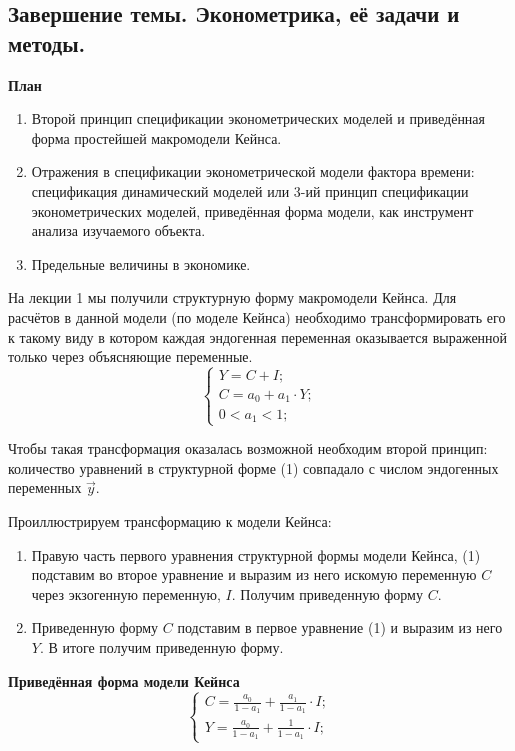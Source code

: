 \documentclass[12pt,a4paper]{article}
\author{GH-TIMe}
\begin{document}
\begin{center}
\section*{Завершение темы. Эконометрика, её задачи и методы.}
\end{center}
\begin{center}
\textbf{План}
\end{center}
\begin{enumerate}
\item Второй принцип спецификации эконометрических моделей и приведённая форма простейшей макромодели Кейнса.
\item Отражения в спецификации эконометрической модели фактора времени: спецификация динамический моделей или 3-ий принцип спецификации эконометрических моделей, приведённая форма модели, как инструмент анализа изучаемого объекта.
\item Предельные величины в экономике.
\end{enumerate}
На лекции 1 мы получили структурную форму макромодели Кейнса. Для расчётов в данной модели (по моделе Кейнса) необходимо трансформировать его к такому виду в котором каждая эндогенная переменная оказывается выраженной только через объясняющие переменные.
\begin{equation}
\begin{cases}
Y = C + I; \\
C = a_0 + a_1 \cdot Y; \\
0 < a_1 < 1;
\end{cases}
\end{equation}

Чтобы такая трансформация оказалась возможной необходим второй принцип: количество уравнений в структурной форме (1) совпадало с числом эндогенных переменных $\vec{y}$. 

Проиллюстрируем трансформацию к модели Кейнса:
\begin{enumerate}
\item Правую часть первого уравнения структурной формы модели Кейнса, (1) подставим во второе уравнение и выразим из него искомую переменную $C$ через экзогенную переменную, $I$. Получим приведенную форму $C$.
\item Приведенную форму $C$ подставим в первое уравнение (1) и выразим из него $Y$. В итоге получим приведенную форму.
\end{enumerate}
\textbf{Приведённая форма модели Кейнса}
\begin{equation}
\begin{cases}
C = \displaystyle{\frac{a_0}{1-a_1} + \frac{a_1}{1-a_1}} \cdot I; \\
Y = \displaystyle{\frac{a_0}{1-a_1} + \frac{1}{1-a_1}} \cdot I;
\end{cases}
\end{equation}
\end{document}
